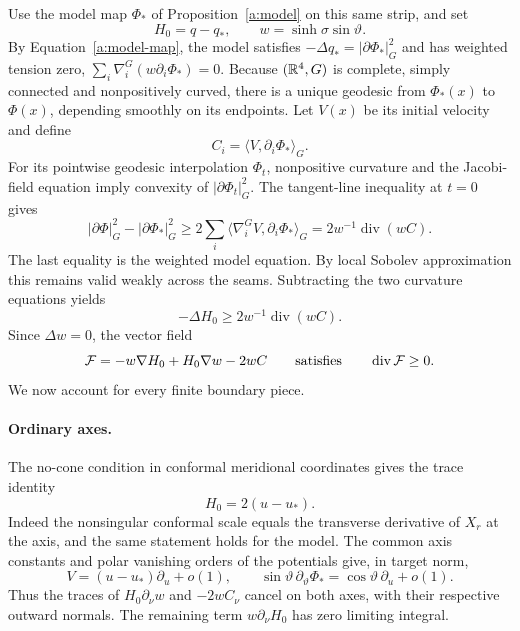 Use the model map $\Phi_*$ of Proposition~\ref{a:model} on this
same strip, and set
\[
 H_0=q-q_*,\qquad w=\sinh\sigma\sin\vartheta.
\]
By Equation~\eqref{a:model-map}, the model satisfies
$-\Delta q_*=|\partial\Phi_*|_G^2$ and has
weighted tension zero,
$\sum_i\nabla_i^G(w\partial_i\Phi_*)=0$.
Because $(\mathbb R^4,G)$ is complete, simply connected and nonpositively
curved, there is a unique geodesic from $\Phi_*(x)$ to $\Phi(x)$,
depending smoothly on its endpoints.  Let $V(x)$ be its initial velocity
and define
\[
 C_i=\langle V,\partial_i\Phi_*\rangle_G.
\]
For its pointwise geodesic interpolation $\Phi_t$, nonpositive curvature
and the Jacobi-field equation imply convexity of
$|\partial\Phi_t|_G^2$.  The tangent-line inequality at $t=0$ gives
\[
 |\partial\Phi|_G^2-|\partial\Phi_*|_G^2
 \ge 2\sum_i\langle\nabla_i^G V,\partial_i\Phi_*\rangle_G
 =2w^{-1}\operatorname{div}(wC).
\]
The last equality is the weighted model equation.  By local Sobolev
approximation this remains valid weakly across the seams.  Subtracting
the two curvature equations yields
\begin{equation}\label{r:target-convexity}
 -\Delta H_0\ge2w^{-1}\operatorname{div}(wC).
\end{equation}
Since $\Delta w=0$, the vector field
\begin{equation}\label{r:comparison-flux}
 \mathcal F=-w\nabla H_0+H_0\nabla w-2wC
 \qquad\hbox{satisfies}\qquad \operatorname{div}\mathcal F\ge0.
\end{equation}
We now account for every finite boundary piece.

\paragraph{Ordinary axes.}
The no-cone condition in conformal meridional coordinates gives the trace
identity
\begin{equation}\label{r:axis-traces}
 H_0=2(u-u_*).
\end{equation}
Indeed the nonsingular conformal scale equals the transverse derivative
of $X_r$ at the axis, and the same statement holds for the model.
The common axis constants and polar vanishing orders of the potentials
give, in target norm,
\[
 V=(u-u_*)\partial_u+o(1),\qquad
 \sin\vartheta\,\partial_\vartheta\Phi_*
       =\cos\vartheta\,\partial_u+o(1).
\]
Thus the traces of $H_0\partial_\nu w$ and $-2wC_\nu$ cancel on both
axes, with their respective outward normals.  The remaining term
$w\partial_\nu H_0$ has zero limiting integral.

